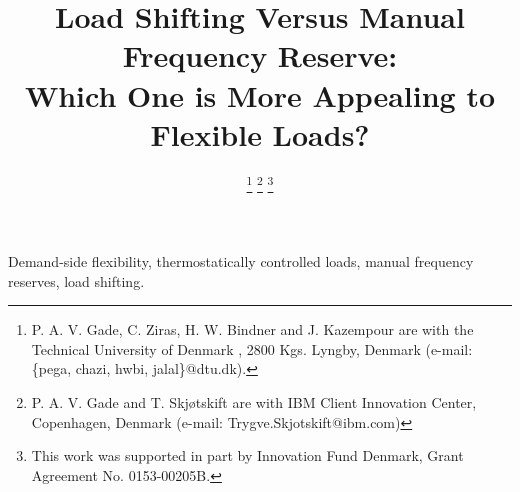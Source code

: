 \documentclass[lettersize,journal]{IEEEtran}
\begin{document}
\title{Load Shifting Versus Manual Frequency Reserve: \\ Which One is More Appealing to Flexible Loads?}

\author{
        \vspace{-0.38cm}
\thanks{P. A. V. Gade, C. Ziras, H. W. Bindner and J. Kazempour are with the Technical University of Denmark , 2800 Kgs. Lyngby, Denmark (e-mail: \{pega, chazi, hwbi, jalal\}@dtu.dk).}
\thanks{P. A. V. Gade and T. Skjøtskift are with IBM Client Innovation Center, Copenhagen, Denmark (e-mail: Trygve.Skjotskift@ibm.com)}
\thanks{This work  was supported in part by Innovation Fund Denmark, Grant Agreement No. 0153-00205B.}
}





\maketitle


\begin{abstract}
    
\end{abstract}

\begin{IEEEkeywords}
    Demand-side flexibility, thermostatically controlled loads, manual frequency reserves, load shifting. 
\end{IEEEkeywords}





\end{document}

